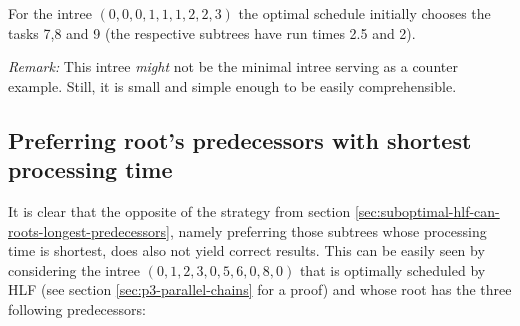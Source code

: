 \begin{center}
\end{center}

For the intree $(0,0,0,1,1,1,2,2,3)$ the optimal schedule initially chooses the tasks 7,8 and 9 (the respective subtrees have run times 2.5 and 2).

\emph{Remark:} This intree \emph{might} not be the minimal intree serving as a counter example. Still, it is small and simple enough to be easily comprehensible.

\subsection{Preferring root's predecessors with shortest processing time}
\label{sec:suboptimal-preferring-root-predecessors-shortest-time}

It is clear that the opposite of the strategy from section \ref{sec:suboptimal-hlf-can-roots-longest-predecessors}, namely preferring those subtrees whose processing time is shortest, does also not yield correct results. This can be easily seen by considering the intree $(0,1,2,3,0,5,6,0,8,0)$ that is optimally scheduled by HLF (see section \ref{sec:p3-parallel-chains} for a proof) and whose root has the three following predecessors:

